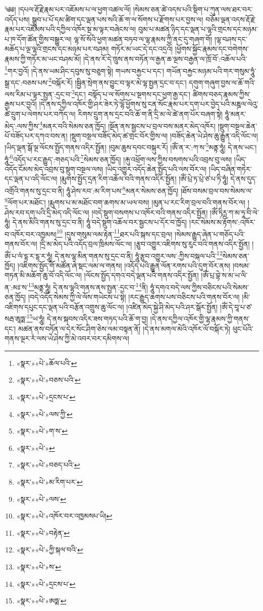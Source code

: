 ༄༅། །དཔལ་རྡོ་རྗེ་རྣམ་པར་འཇོམས་པ་ལ་ཕྱག་འཚལ་ལོ། །སེམས་ཅན་ཚེ་འདས་པའི་སྡིག་པ་ཀུན་ལས་ཐར་བར་འདོད་པས། སྒྲུབ་པ་པོ་དམ་ཚིག་དང་ལྡན་པས་སའི་ཆོ་ག་ལ་སོགས་པ་རྫོགས་པར་བྱས་ལ། བཅོམ་ལྡན་འདས་རྡོ་རྗེ་རྣམ་པར་འཇོམས་པའི་དཀྱིལ་འཁོར་སྔ་མ་ལྟར་བཞེངས་ལ། བུམ་པ་མཚན་ཉིད་དང་ལྡན་པ་ལྷའི་གྲངས་དང་མཉམ་པ་ཁ་དོག་ཚོན་གྱིས་བསྒྱུར་ལ། ལྷ་སོ་སོའི་ཕྱག་མཚན་བཏབ་ལ་ལྷ་རྣམས་ཀྱི་ནང་དུ་གཞག་གོ། །ལྷ་བཤས་དང་མཆོད་པ་ལྔ་ལྷའི་གྲངས་དང་མཉམ་པར་བཤམ། གཏོར་མ་ཡང་དེ་དང་འདྲའོ། །ཕྱོགས་སྐྱོང་རྣམས་དང་བགེགས་རྣམས་ཀྱི་གཏོར་མ་ཡང་བཤམ་མོ། །དེ་ནས་རོ་དེ་ཁྲུས་ནས་བཏོན་ལ་རྒྱན་ཆ་ལྔས་བརྒྱན་ལ་ཁྲོ་བོ་:འཆོལ་པའི་\footnote{«སྣར་»«པེ་»ཆོལ་པའི་}གར་བྱའོ། །དེ་ནས་ཡམ་ཤིང་དབུས་སུ་བཅུག་སྟེ། གཡས་བརྐྱང་པ་དང་། གཡོན་བརྐྱང་མཉམ་པའི་གར་གསུམ་ཧཱུཾ་སྒྲ་དང་:བཅས་པས་\footnote{«སྣར་»«པེ་»བཅས་པའི་}བསྐོར་རོ། །སྦྱིན་སྲེག་ནས་བྱུང་བ་ལྟར་མེ་ལྷ་སྤྱན་དྲང་བ་དང་། དགུག་གཞུག་བྱས་ལ་ཆོ་གའི་ལས་རིམ་པ་ལྟར་སྤྱན་:དྲང་བ་\footnote{«སྣར་»«པེ་»དྲངས་པ་}དང་། བསྟོད་པ་ལ་སོགས་པ་སྔགས་དང་ཕྱག་རྒྱ་དང་། ཚིགས་བཅད་རྣམས་ཀྱིས་རྒྱས་པར་བྱའོ། །དེ་ནས་དཀྱིལ་འཁོར་གྱི་ཤར་ཟེར་ཏེ་ལྷོ་ཕྱོགས་སུ་ངན་སོང་རྣམ་པར་དག་པར་བྱེད་པའི་མཎྜལ་ལེའུ་ཚེ་དྲུག་པ་ལེགས་པར་བཀོད་ལ། རིགས་དྲུག་ནས་དྲང་བའི་ཆོ་ག་ནི་དྲི་མ་ལེ་ཚེ་ནག་པོར་བཞག་སྟེ། ཧཱུཾ་མནར་མེད་:ལས་ཀྱིས་\footnote{«སྣར་»«པེ་»ལས་ཀྱི་}མནར་བའི་སེམས་ཅན་ཁྱོད། །སྔོན་ནས་སྦྱངས་པ་བྲལ་བས་མནར་མེད་འཁོར། །སྡུག་བསྔལ་ཆེན་པོ་བཟོད་པར་དཀའ་བས་ན། །སྡུག་བསྔལ་བཟོད་མེད་ཚ་གྲང་བོར་གྱིས་ལ། །བཟོད་ཆེན་ཡེ་ཤེས་ཆུ་རྒྱུན་འདི་ལོང་ལ། །ཡིད་ལྡན་སྒོ་ལྔ་ལོངས་སྤྱོད་གནས་འདིར་སྤྱོན། །བུམ་ཆུས་དབང་བསྐུར་རོ། །ཨོཾ་ན་ར་:ཀ་ས་\footnote{«སྣར་»«པེ་»ག་ས་}མནྟ་ཧཱུཾ། དེ་ནས་ཡང་། ཧཱུཾ་\footnote{«སྣར་»«པེ་»}འདོད་པ་རང་རྒྱུད་:གཅད་པའི་\footnote{«སྣར་»«པེ་»བཅད་པའི་}སེམས་ཅན་ཁྱོད། །རྐུ་འཕྲོག་ལས་ཀྱིས་བསགས་པའི་འབྲས་བུ་ལས། །ཡིད་འདོད་ངོམས་མེད་འབྲས་བུ་སྡུག་བསྔལ་ལས། །ཡིད་འགྱུར་འདོད་ཆེན་སྤྱོད་པའི་ལས་བོར་ལ། །ཡིད་བཞིན་གཏེར་དང་ལྡན་པ་འདི་ལོང་ལ། །རྨུགས་སྤྱོད་དྲན་རིག་འཆོལ་བའི་གནས་འདིར་སྤྱོན། །ཨོཾ་པྲེ་ཏ་པྲེ་ཙ་པ་ཏི་ཧཱུཾ། དེ་ནས་དུད་འགྲོའི་གནས་སུ་དྲང་བ་ནི། ཧཱུཾ་ཤེས་རབ་:མ་རིག་པས་\footnote{«སྣར་»«པེ་»མ་རིག་པར་}མནར་སེམས་ཅན་ཁྱོད། །ཐོས་བསམ་བྲལ་བས་སེམས་ལ་\footnote{«སྣར་»«པེ་»ལས་}ལོག་པར་མཐོང་། །རྨུགས་པ་མ་མཐོང་བག་ཆགས་མ་ཡལ་བས། །མུན་པ་རང་རིག་བྲལ་བའི་གནས་བོར་ལ། །ཤེས་རབ་དག་པའི་དྲི་མེད་འདི་ལོང་ལ། །བདེ་སྡུག་བསགས་པ་འཁོར་བའི་གནས་འདིར་སྤྱོན། །ཨོཾ་ཏིཪྻ་ཀ་མ་ཧཱ་བི་ལེ་ཧཱུཾ། དེ་ནས་མིའི་གནས་སུ་དྲང་བ་ནི། ཧཱུཾ་བདེ་སྡུག་འཆོལ་བར་སྦྱངས་པ་དོར་བ་ཁྱོད། །རང་སེམས་མ་རྟོགས་:འཁོར་བ་འཁོར་བར་འཁྱམས།\footnote{«སྣར་»«པེ་»འཁོར་བར་འཁྱམསཔ་ཡི།} །དུས་གསུམ་ལམ་རྟེན་\footnote{«སྣར་»«པེ་»བརྟེན་}ཐར་པའི་སྐས་དང་བྲལ། །སེམས་རྒྱུད་ཞེན་པ་གཅོད་པའི་གནས་བོར་ལ། །དྲི་མ་མེད་པའི་འདོད་བྲལ་ཁྲིམས་ལོང་ལ། །རྩུབ་འགྱུར་འཇིགས་སུ་རུང་བའི་གནས་འདིར་སྤྱོན། །ཨོཾ་པ་ལཾ་དྷ་ར་དྷ་ར་ཧཱུཾ། དེ་ནས་ལྷ་མིན་གནས་སུ་དྲང་བ་ནི། ཧཱུཾ་རྩུབ་འགྱུར་ལས་:ཀྱིས་བསྐལ་པའི་\footnote{«སྣར་»«པེ་»ཀྱི་སྐལ་བའི་}སེམས་ཅན་ཁྱོད། །འཇིགས་སྤྱོད་གོ་མཚོན་ཞེ་སྡང་ལམ་ལ་གནས། །འདོད་པའི་རྒྱུན་ལོན་རགས་པའི་དུག་བོར་ནས། །བསམ་གཏན་མི་མཆོག་ཆུ་བོ་འདི་ལོང་ལ། །ལོངས་སྤྱོད་དགའ་བདེ་ལྡན་པའི་གནས་འདིར་སྤྱོན། །ཨོཾ་པྲ་བྷེ་ས་མ་ཡ་ལི་ན་:མཿ་ས་\footnote{«སྣར་»«པེ་»ས་}མནྟ་ཧཱུཾ། དེ་ནས་ལྷའི་གནས་ནས་སྤྱན་:དྲང་བ་\footnote{«སྣར་»«པེ་»དྲངས་པ་}ནི། ཧཱུཾ་དགའ་བདེ་ལས་ཀྱིས་བཅིངས་པའི་སེམས་ཅན་ཁྱོད། །བདེ་འདོད་སེམས་ཀྱི་ལེ་ལོས་གཡེངས་པ་སྟེ། །རང་རྒྱུད་ཆགས་པས་བཅིངས་པའི་གནས་བོར་ལ། །མི་འཇིགས་དཔུང་དང་ལྡན་པའི་བརྩོན་འགྲུས་ཆུ་ལོང་ལ། །འཛིན་མེད་སྐྱེ་ཤི་མེད་པའི་ཤར་སྒོར་སྤྱོན། །ཨོཾ་དེ་བཱ་པ་ཙ་སརྦ་ཨཱཏྨ་\footnote{«སྣར་»«པེ་»ཨཏྨ་}ཡ་ཧཱུཾ། དེ་ནས་སྐབས་འདིར་ཟས་གཏད་པའི་ཆོ་ག་བྱ། །དེ་ནས་དཀྱིལ་འཁོར་གྱི་ལྷ་རྣམས་ཀྱི་གནས་དང་། མཚན་ནས་བཏོན་ལ་དེར་སོང་ཤིག་ཅེས་ལམ་བསྟན་ནོ། །དེ་ནས་མགལ་མེའི་འཁོར་ལོ་བསྐོར་ཏེ། ཕུང་པོའི་གནས་ལྔར་རཾ་ལས་ཡེ་ཤེས་ཀྱི་མེ་འབར་བར་དམིགས་ལ། 
